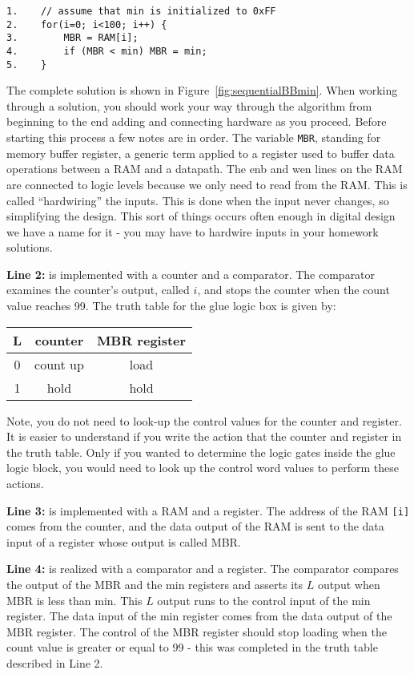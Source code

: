 \begin{verbatim}
1.    // assume that min is initialized to 0xFF
2.    for(i=0; i<100; i++) {
3.        MBR = RAM[i];
4.        if (MBR < min) MBR = min;
5.    }
\end{verbatim}

The complete solution is shown in Figure~\ref{fig:sequentialBBmin}.  When working through 
a solution, you should work your way through the algorithm from beginning to the end
adding and connecting hardware as you proceed.  Before starting this process a few notes
are in order. The variable \verb+MBR+, standing for memory buffer register, a generic
term applied to a register used to buffer data operations between a RAM and 
a datapath.  The enb and wen lines on the RAM are connected to logic levels because
we only need to read from the RAM.  This is called ``hardwiring'' the inputs.  This is 
done when the input never changes, so simplifying the design.  This sort of things 
occurs often enough in digital design we have a name for it - you may have to 
hardwire inputs in your homework solutions.

\textbf{Line 2:} is implemented with a 
counter and a comparator.  The comparator examines the counter's output, called $i$, 
and stops the counter when the count value reaches 99.  The truth table for the 
glue logic box is given by:

\begin{tabular}{c||c|c}
L & counter & MBR register 	\\ \hline \hline
0 & count up & load 		\\ \hline
1 & hold 	& hold 		\\ 
\end{tabular}

Note, you do not need to look-up the control values for the counter and
register.  It is easier to understand if you write the action that the counter 
and register in the truth table. Only if you wanted to determine the logic gates
inside the glue logic block, you would need to look up the control word
values to perform these actions.


\textbf{Line 3:} is implemented with a RAM and a 
register.  The address of the RAM \verb+[i]+ comes from the counter, and the 
data output of the RAM is sent to the data input of a register whose output is called MBR.  

\textbf{Line 4: }
 is realized with a comparator and 
a register.  The comparator compares the output of the MBR and the min
registers and asserts its $L$ output when MBR is less than min.  This 
$L$ output runs to the control input of the min register.  The data 
input of the min register comes from the data output of the MBR 
register.  The control of the MBR register should stop loading when 
the count value is greater or equal to 99 - this was completed in
the truth table described in Line 2.

